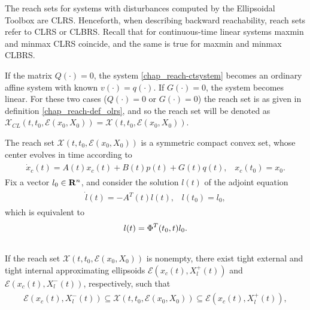 \documentclass[letterpaper,10pt,english]{sphinxmanual}
\begin{document}
The reach sets for systems with disturbances computed by the Ellipsoidal
Toolbox are CLRS. Henceforth, when describing backward reachability,
reach sets refer to CLRS or CLBRS. Recall that for continuous-time
linear systems maxmin and minmax CLRS coincide, and the same is true for
maxmin and minmax CLBRS.

If the matrix $Q(\cdot)=0$, the system \eqref{chap_reach-ctsystem} becomes an
ordinary affine system with known $v(\cdot)=q(\cdot)$. If
$G(\cdot) = 0$, the system becomes linear. For these two cases
($Q(\cdot)=0$ or $G(\cdot)=0$) the reach set is as given in
definition \eqref{chap_reach-def_olrs}, and so the reach set will be denoted as
${\mathcal X}_{CL}(t, t_0, {\mathcal E}(x_0, X_0)) = {\mathcal X}(t, t_0, {\mathcal E}(x_0,X_0))$.

The reach set ${\mathcal X}(t,t_0,{\mathcal E}(x_0,X_0))$ is a
symmetric compact convex set, whose center evolves in time according to
\label{chap_reach:equation-fwdcenter}\begin{gather}
\begin{split}\dot{x}_c(t) = A(t)x_c(t) + B(t)p(t) + G(t)q(t), \;\;\;
x_c(t_0)=x_0.\end{split}\label{chap_reach-fwdcenter}
\end{gather}
Fix a vector $l_0\in{\bf R}^n$, and consider the solution
$l(t)$ of the adjoint equation
\label{chap_reach:equation-adjointct}\begin{gather}
\begin{split}\dot{l}(t) = -A^T(t)l(t), \;\;\; l(t_0) = l_0,\end{split}\label{chap_reach-adjointct}
\end{gather}
which is equivalent to
\begin{gather}
\begin{split}l(t) = \Phi^T(t_0, t)l_0.\end{split}\notag\\\begin{split}\end{split}\notag
\end{gather}
If the reach set ${\mathcal X}(t, t_0, {\mathcal E}(x_0,X_0))$ is
nonempty, there exist tight external and tight internal approximating
ellipsoids ${\mathcal E}(x_c(t), X^+_l(t))$ and
${\mathcal E}(x_c(t), X^-_l(t))$, respectively, such that
\label{chap_reach:equation-fwdinclusion}\begin{gather}
\begin{split}{\mathcal E}(x_c(t), X^-_l(t))\subseteq{\mathcal X}(t,t_0,{\mathcal E}(x_0,X_0))
\subseteq {\mathcal E}(x_c(t), X^+_l(t)),\end{split}\label{chap_reach-fwdinclusion}
\end{gather}
\end{document}
